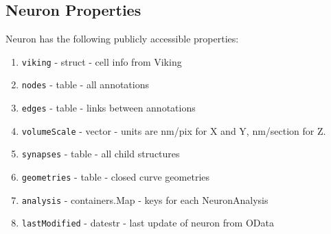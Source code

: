 \documentclass[12pt]{exam}
\begin{document}
	\subsection{Neuron Properties}
	Neuron has the following publicly accessible properties:
	\begin{enumerate}
		\item \texttt{viking} - struct - cell info from Viking
		\item \texttt{nodes} - table - all annotations 
		\item \texttt{edges} - table - links between annotations
		\item \texttt{volumeScale} - vector - units are nm/pix for X and Y, nm/section for Z.
		\item \texttt{synapses} - table - all child structures
		\item \texttt{geometries} - table - closed curve geometries
		\item \texttt{analysis} - containers.Map - keys for each NeuronAnalysis
		\item \texttt{lastModified} - datestr - last update of neuron from OData
	\end{enumerate}
\end{document}
